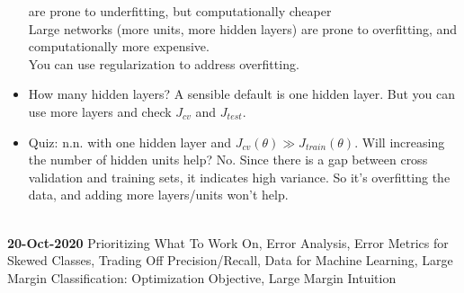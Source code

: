 \documentclass[10pt]{article}
\begin{document}
\begin{itemize}
    are prone to underfitting, but computationally cheaper\\ Large
    networks (more units, more hidden layers) are prone to
    overfitting, and computationally more expensive. \\ You can use
    regularization to address overfitting.
  \item How many hidden layers? A sensible default is one hidden layer. But you can use more layers and check $J_{cv}$ and $J_{test}$.
  \item Quiz: n.n. with one hidden layer and $J_{cv}(\theta) \gg
    J_{train}(\theta)$. Will increasing the number of hidden units
    help? No. Since there is a gap between cross validation and
    training sets, it indicates high variance. So it's overfitting the
    data, and adding more layers/units won't help.
\end{itemize}
\hfill \\
{\large \textbf{20-Oct-2020} Prioritizing What To Work On, Error Analysis, Error Metrics for Skewed Classes, Trading Off Precision/Recall, Data for Machine Learning, Large Margin Classification: Optimization Objective, Large Margin Intuition}
\end{document}
